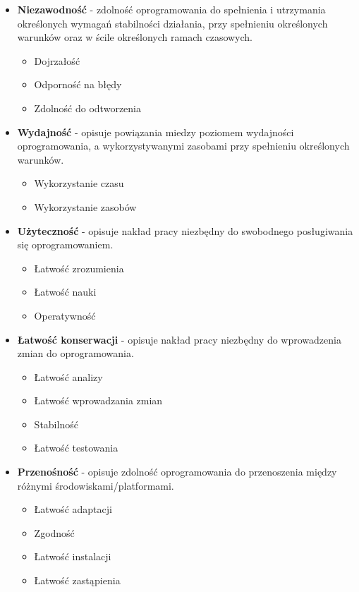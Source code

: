 \documentclass[a4paper]{article}
\begin{document}
    \begin{itemize}
        \item \textbf{Niezawodność} - zdolność oprogramowania do spełnienia i utrzymania
        określonych wymagań stabilności działania, przy spełnieniu określonych
        warunków oraz w ścile określonych ramach czasowych.
        \begin{itemize}
            \item Dojrzałość
            \item Odporność na błędy
            \item Zdolność do odtworzenia
        \end{itemize}
        \item \textbf{Wydajność} - opisuje powiązania miedzy poziomem wydajności oprogramowania, a
        wykorzystywanymi zasobami przy spełnieniu określonych warunków.
        \begin{itemize}
            \item Wykorzystanie czasu
            \item Wykorzystanie zasobów
        \end{itemize}
        \item \textbf{Użyteczność} - opisuje nakład pracy niezbędny do swobodnego posługiwania się oprogramowaniem.
        \begin{itemize}
            \item Łatwość zrozumienia
            \item Łatwość nauki
            \item Operatywność
        \end{itemize}
        \item \textbf{Łatwość konserwacji} - opisuje nakład pracy niezbędny do wprowadzenia zmian do oprogramowania.
        \begin{itemize}
            \item Łatwość analizy
            \item Łatwość wprowadzania zmian
            \item Stabilność
            \item Łatwość testowania
        \end{itemize}
        \item \textbf{Przenośność} - opisuje zdolność oprogramowania do przenoszenia między różnymi środowiskami/platformami.
        \begin{itemize}
            \item Łatwość adaptacji
            \item Zgodność
            \item Łatwość instalacji
            \item Łatwość zastąpienia
        \end{itemize}
    \end{itemize}
\end{document}
